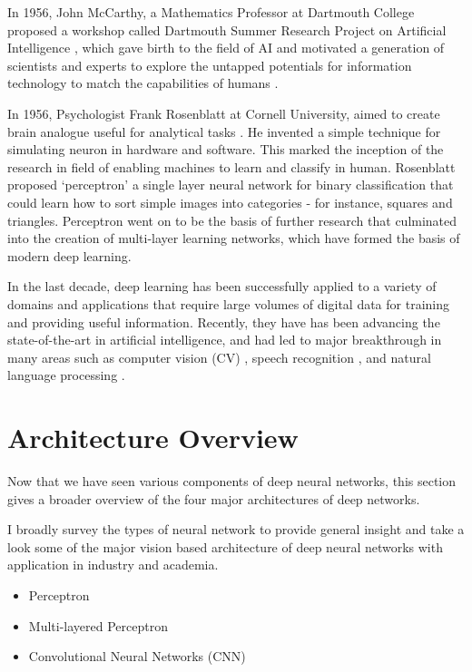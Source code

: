 In 1956, John McCarthy, a Mathematics Professor at Dartmouth College proposed a workshop called Dartmouth Summer Research Project on Artificial Intelligence \cite{edselc.2-52.0-3384609253620061201}, which gave birth to the field of AI and motivated a generation of scientists and experts to explore the untapped potentials for information technology to match the capabilities of humans \cite{sejnowski2018deep}.

In 1956, Psychologist Frank Rosenblatt at Cornell University, aimed to create brain analogue useful for analytical tasks \cite{2016397}.  He invented a simple technique for simulating neuron in hardware and software. This marked the inception of the research in field of enabling machines to learn and classify in human. Rosenblatt proposed ‘perceptron’ a single layer neural network for binary classification that could learn how to sort simple images into categories - for instance, squares and triangles. Perceptron went on to be the basis of further research that culminated into the creation of multi-layer learning networks, which have formed the basis of modern deep learning\cite{2016397}.

In the last decade, deep learning has been successfully applied to a variety of domains and applications \cite{dl_evolution} that require large volumes of digital data for training and providing useful information. Recently, they have has been advancing the state-of-the-art in artificial intelligence, and had led to major breakthrough in many areas such as computer vision (CV) \cite{krizhevsky2012imagenet} \cite{karpathy2014large}, speech recognition \cite{graves2013speech} \cite{mohamed2012acoustic}, and natural language processing \cite{bengio2003neural} \cite{mikolov2013distributed} \cite{mikolov2010recurrent}.

\section{Architecture Overview}

Now that we have seen various components of deep neural networks, this section gives a broader overview of the four major architectures of deep networks.

I broadly survey the types of neural network to provide general insight and take a look some of the major vision based architecture of deep neural networks with application in industry and academia. 

\begin{itemize}
\item Perceptron
\item  Multi-layered Perceptron
\item Convolutional Neural Networks (CNN)
\end{itemize}


